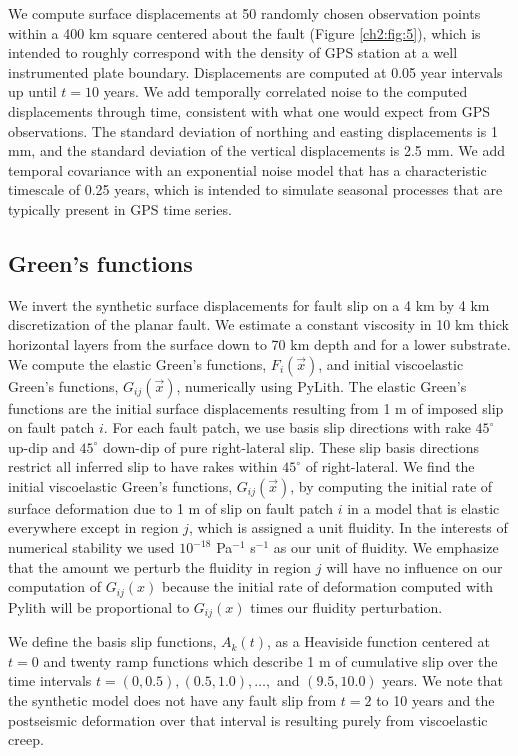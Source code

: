We compute surface displacements at 50 randomly chosen observation
points within a 400 km square centered about the fault (Figure \ref{ch2:fig:5}), which
is intended to roughly correspond with the density of GPS station at a
well instrumented plate boundary.  Displacements are computed at 0.05
year intervals up until $t=10$ years.  We add temporally correlated
noise to the computed displacements through time, consistent with what
one would expect from GPS observations.  The standard deviation of
northing and easting displacements is 1 mm, and the standard deviation
of the vertical displacements is 2.5 mm.  We add temporal covariance
with an exponential noise model that has a characteristic timescale of
0.25 years, which is intended to simulate seasonal processes that are
typically present in GPS time series.

\subsection{Green's functions}\label{ch2:sec:GreensFunc}
We invert the synthetic surface displacements for fault slip on a 4 km
by 4 km discretization of the planar fault.  We estimate a constant
viscosity in 10 km thick horizontal layers from the surface down to 70
km depth and for a lower substrate. We compute the elastic Green's
functions, $F_i(\vec{x})$, and initial viscoelastic Green's functions,
$G_{ij}(\vec{x})$, numerically using PyLith.  The elastic Green's
functions are the initial surface displacements resulting from 1 m of
imposed slip on fault patch $i$.  For each fault patch, we use basis
slip directions with rake $45^\circ$ up-dip and $45^\circ$ down-dip of
pure right-lateral slip.  These slip basis directions restrict all
inferred slip to have rakes within $45^\circ$ of right-lateral. We
find the initial viscoelastic Green's functions, $G_{ij}(\vec{x})$, by
computing the initial rate of surface deformation due to 1 m of slip
on fault patch $i$ in a model that is elastic everywhere except in
region $j$, which is assigned a unit fluidity.  In the interests of
numerical stability we used $10^{-18}$ Pa$^{-1}$ s$^{-1}$ as our unit
of fluidity.  We emphasize that the amount we perturb the fluidity in
region $j$ will have no influence on our computation of $G_{ij}(x)$
because the initial rate of deformation computed with Pylith will be
proportional to $G_{ij}(x)$ times our fluidity perturbation.

We define the basis slip functions, $A_k(t)$, as a Heaviside function
centered at $t=0$ and twenty ramp functions which describe 1 m of
cumulative slip over the time intervals $t = (0,0.5), (0.5,1.0),
\dots,$ and $(9.5,10.0)$ years. We note that the synthetic model does
not have any fault slip from $t=2$ to 10 years and the postseismic
deformation over that interval is resulting purely from viscoelastic
creep.

